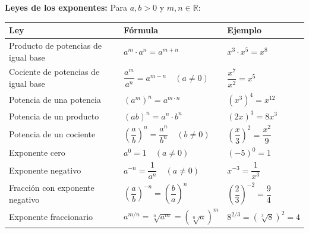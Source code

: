 \documentclass[12pt, letterpaper]{article}
\begin{document}
\begin{cuadroteoria}
      \textbf{Leyes de los exponentes:} Para $a, b > 0$ y $m, n \in \mathbb{R}$:
      \begin{center}
            \small
            \begin{tabular}{lll}
                  \toprule
                  \textbf{Ley}                        & \textbf{Fórmula}                                                  & \textbf{Ejemplo}                                \\
                  \midrule
                  Producto de potencias de igual base & $a^m \cdot a^n = a^{m+n}$                                         & $x^3 \cdot x^5 = x^8$                           \\
                  Cociente de potencias de igual base & $\dfrac{a^m}{a^n} = a^{m-n} \quad (a \neq 0)$                     & $\dfrac{x^7}{x^2} = x^5$                        \\
                  Potencia de una potencia            & $(a^m)^n = a^{m \cdot n}$                                         & $(x^3)^4 = x^{12}$                              \\
                  Potencia de un producto             & $(ab)^n = a^n \cdot b^n$                                          & $(2x)^3 = 8x^3$                                 \\
                  Potencia de un cociente             & $\left(\dfrac{a}{b}\right)^n = \dfrac{a^n}{b^n} \quad (b \neq 0)$ & $\left(\dfrac{x}{3}\right)^2 = \dfrac{x^2}{9}$  \\
                  Exponente cero                      & $a^0 = 1 \quad (a \neq 0)$                                        & $(-5)^0 = 1$                                    \\
                  Exponente negativo                  & $a^{-n} = \dfrac{1}{a^n} \quad (a \neq 0)$                        & $x^{-3} = \dfrac{1}{x^3}$                       \\
                  Fracción con exponente negativo     & $\left(\dfrac{a}{b}\right)^{-n} = \left(\dfrac{b}{a}\right)^n$    & $\left(\dfrac{2}{3}\right)^{-2} = \dfrac{9}{4}$ \\
                  Exponente fraccionario              & $a^{m/n} = \sqrt[n]{a^m} = (\sqrt[n]{a})^m$                       & $8^{2/3} = (\sqrt[3]{8})^2 = 4$                 \\
                  \bottomrule
            \end{tabular}
      \end{center}
\end{cuadroteoria}
\end{document}
